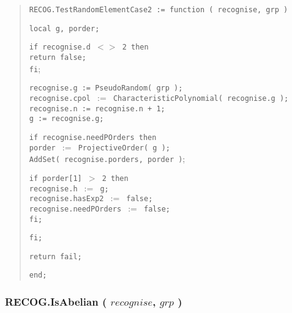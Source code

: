 \documentclass[a4paper,11pt]{article}
\theoremstyle{bla}
\begin{document}
\begin{quote}
\hspace*{-0.3cm} \texttt{RECOG.TestRandomElementCase2 := function ( recognise, grp )}

  \texttt{local g, porder;}

  \texttt{if recognise.d $<>$ 2 then}\\
    \hspace*{0.3cm} \texttt{return false;}\\
  \texttt{fi};

  \texttt{recognise.g := PseudoRandom( grp );}\\
  \texttt{recognise.cpol $:=$ CharacteristicPolynomial( recognise.g );}\\
  \texttt{recognise.n := recognise.n + 1;}\\
  \texttt{g := recognise.g;}

  \texttt{if recognise.needPOrders then}\\
    \hspace*{0.3cm} \texttt{porder $:=$ ProjectiveOrder( g );}\\
    \hspace*{0.3cm} \texttt{AddSet( recognise.porders, porder )};

    \hspace*{0.3cm} \texttt{if porder[1] $>$ 2 then}\\
      \hspace*{0.6cm} \texttt{recognise.h $:=$ g;}\\
      \hspace*{0.6cm} \texttt{recognise.hasExp2 $:=$ false;}\\
      \hspace*{0.6cm} \texttt{recognise.needPOrders $:=$ false;}\\
    \hspace*{0.3cm} \texttt{fi;}

  \texttt{fi;}

  \texttt{return fail;}

\hspace*{-0.3cm} \texttt{end;}
\end{quote}


\subsubsection{RECOG.IsAbelian ( $recognise$, $grp$ )}\label{abelsch}
\end{document}
